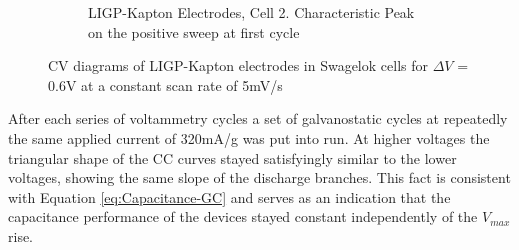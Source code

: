 \begin{figure}[H]
\begin{subfigure}{0.49\textwidth}
\captionsetup{width=0.9\linewidth}
\caption{LIGP-Kapton Electrodes, Cell 2. Characteristic Peak on the positive sweep at first cycle}
\label{fig:LIG-PI-cell2-CV-12-reduction}
\end{subfigure}
\medskip
\caption{CV diagrams of LIGP-Kapton electrodes in Swagelok cells for $\Delta V$ = 0.6\:V at a constant scan rate of 5\:mV/s}
\label{fig:LIG-PI-CV-06}
\end{figure}

After each series of voltammetry cycles a set of galvanostatic cycles at repeatedly the same applied current of 320\:mA/g was put into run. At higher voltages the triangular shape of the CC curves stayed satisfyingly similar to the lower voltages, showing the same slope of the discharge branches. This fact is consistent with Equation \ref{eq:Capacitance-GC} and serves as an indication that the capacitance performance of the devices stayed constant independently of the $V_{max}$ rise.  

